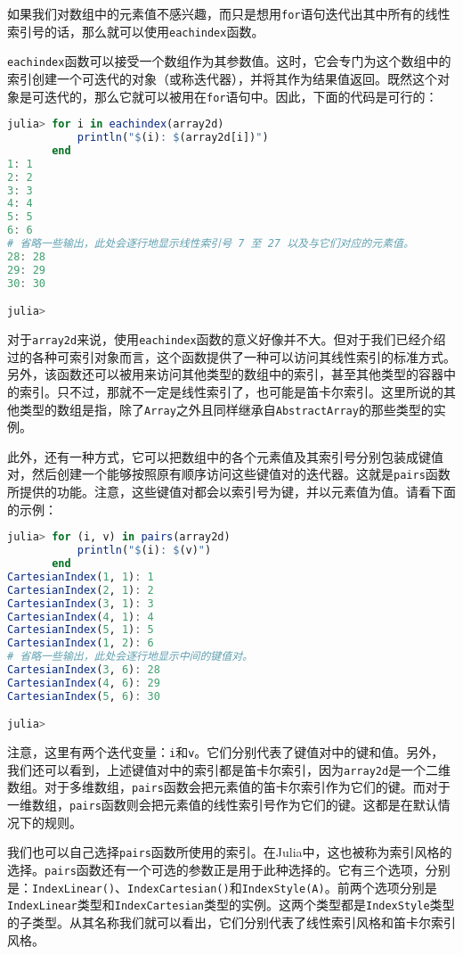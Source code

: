 如果我们对数组中的元素值不感兴趣，而只是想用\verb`for`语句迭代出其中所有的线性索引号的话，那么就可以使用\verb`eachindex`函数。

\verb`eachindex`函数可以接受一个数组作为其参数值。这时，它会专门为这个数组中的索引创建一个可迭代的对象（或称迭代器），并将其作为结果值返回。既然这个对象是可迭代的，那么它就可以被用在\verb`for`语句中。因此，下面的代码是可行的：

\begin{lstlisting}[language=julia]
julia> for i in eachindex(array2d)
           println("$(i): $(array2d[i])")
       end
1: 1
2: 2
3: 3
4: 4
5: 5
6: 6
# 省略一些输出，此处会逐行地显示线性索引号 7 至 27 以及与它们对应的元素值。
28: 28
29: 29
30: 30

julia> 
\end{lstlisting}

对于\verb`array2d`来说，使用\verb`eachindex`函数的意义好像并不大。但对于我们已经介绍过的各种可索引对象而言，这个函数提供了一种可以访问其线性索引的标准方式。另外，该函数还可以被用来访问其他类型的数组中的索引，甚至其他类型的容器中的索引。只不过，那就不一定是线性索引了，也可能是笛卡尔索引。这里所说的其他类型的数组是指，除了\verb`Array`之外且同样继承自\verb`AbstractArray`的那些类型的实例。

此外，还有一种方式，它可以把数组中的各个元素值及其索引号分别包装成键值对，然后创建一个能够按照原有顺序访问这些键值对的迭代器。这就是\verb`pairs`函数所提供的功能。注意，这些键值对都会以索引号为键，并以元素值为值。请看下面的示例：

\begin{lstlisting}[language=julia]
julia> for (i, v) in pairs(array2d)
           println("$(i): $(v)")
       end
CartesianIndex(1, 1): 1
CartesianIndex(2, 1): 2
CartesianIndex(3, 1): 3
CartesianIndex(4, 1): 4
CartesianIndex(5, 1): 5
CartesianIndex(1, 2): 6
# 省略一些输出，此处会逐行地显示中间的键值对。
CartesianIndex(3, 6): 28
CartesianIndex(4, 6): 29
CartesianIndex(5, 6): 30

julia> 
\end{lstlisting}

注意，这里有两个迭代变量：\verb`i`和\verb`v`。它们分别代表了键值对中的键和值。另外，我们还可以看到，上述键值对中的索引都是笛卡尔索引，因为\verb`array2d`是一个二维数组。对于多维数组，\verb`pairs`函数会把元素值的笛卡尔索引作为它们的键。而对于一维数组，\verb`pairs`函数则会把元素值的线性索引号作为它们的键。这都是在默认情况下的规则。

我们也可以自己选择\verb`pairs`函数所使用的索引。在Julia中，这也被称为索引风格的选择。\verb`pairs`函数还有一个可选的参数正是用于此种选择的。它有三个选项，分别是：\verb`IndexLinear()`、\verb`IndexCartesian()`和\verb`IndexStyle(A)`。前两个选项分别是\verb`IndexLinear`类型和\verb`IndexCartesian`类型的实例。这两个类型都是\verb`IndexStyle`类型的子类型。从其名称我们就可以看出，它们分别代表了线性索引风格和笛卡尔索引风格。

